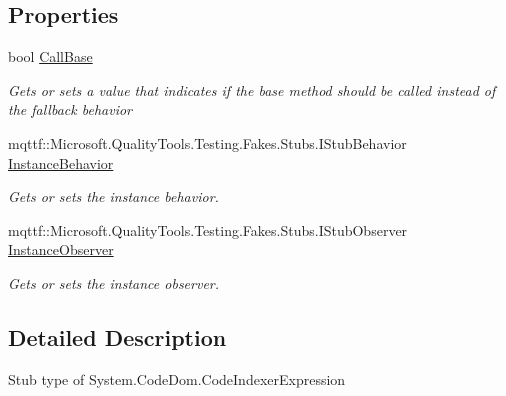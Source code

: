 \subsection*{Properties}
\begin{DoxyCompactItemize}
\item 
bool \hyperlink{class_system_1_1_code_dom_1_1_fakes_1_1_stub_code_indexer_expression_af681ac655092284bb9ae3afaf42c737d}{Call\-Base}
\begin{DoxyCompactList}\small\item\em Gets or sets a value that indicates if the base method should be called instead of the fallback behavior\end{DoxyCompactList}\item 
mqttf\-::\-Microsoft.\-Quality\-Tools.\-Testing.\-Fakes.\-Stubs.\-I\-Stub\-Behavior \hyperlink{class_system_1_1_code_dom_1_1_fakes_1_1_stub_code_indexer_expression_a8293443ca29eeb91e23c71b4a6472b9d}{Instance\-Behavior}
\begin{DoxyCompactList}\small\item\em Gets or sets the instance behavior.\end{DoxyCompactList}\item 
mqttf\-::\-Microsoft.\-Quality\-Tools.\-Testing.\-Fakes.\-Stubs.\-I\-Stub\-Observer \hyperlink{class_system_1_1_code_dom_1_1_fakes_1_1_stub_code_indexer_expression_a3c9ef34cca9012835deb2d64ac290529}{Instance\-Observer}
\begin{DoxyCompactList}\small\item\em Gets or sets the instance observer.\end{DoxyCompactList}\end{DoxyCompactItemize}


\subsection{Detailed Description}
Stub type of System.\-Code\-Dom.\-Code\-Indexer\-Expression




